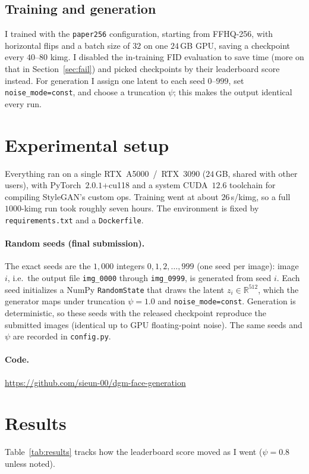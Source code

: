\documentclass{article}
\begin{document}
\subsection{Training and generation}
I trained with the \texttt{paper256} configuration, starting from FFHQ-256, with horizontal flips and a
batch size of $32$ on one $24$\,GB GPU, saving a checkpoint every $40$--$80$ kimg. I disabled the
in-training FID evaluation to save time (more on that in Section~\ref{sec:fail}) and picked checkpoints by
their leaderboard score instead. For generation I assign one latent to each seed $0$--$999$, set
\texttt{noise\_mode=const}, and choose a truncation $\psi$; this makes the output identical every run.

\section{Experimental setup}
Everything ran on a single RTX~A5000~/~RTX~3090 ($24$\,GB, shared with other users), with
PyTorch~$2.0.1$+cu118 and a system CUDA~$12.6$ toolchain for compiling StyleGAN's custom ops. Training went
at about $26$\,s/kimg, so a full $1000$-kimg run took roughly seven hours. The environment is fixed by
\texttt{requirements.txt} and a \texttt{Dockerfile}.

\paragraph{Random seeds (final submission).} The exact seeds are the $1{,}000$ integers
$0, 1, 2, \dots, 999$ (one seed per image): image $i$, i.e.\ the output file \texttt{img\_0000} through
\texttt{img\_0999}, is generated from seed $i$. Each seed initializes a NumPy \texttt{RandomState} that
draws the latent $z_i \in \mathbb{R}^{512}$, which the generator maps under truncation $\psi = 1.0$ and
\texttt{noise\_mode=const}. Generation is deterministic, so these seeds with the released checkpoint
reproduce the submitted images (identical up to GPU floating-point noise). The same seeds and $\psi$ are
recorded in \texttt{config.py}.

\paragraph{Code.} \url{https://github.com/sieun-00/dgm-face-generation}

\section{Results}
Table~\ref{tab:results} tracks how the leaderboard score moved as I went ($\psi=0.8$ unless noted).
\end{document}
